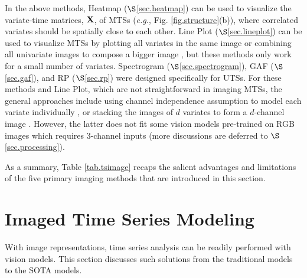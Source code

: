 In the above methods, Heatmap ($\S$\ref{sec.heatmap}) can be %
used to visualize the %
variate-time matrices, ${\bf X}$, of MTSs ({\em e.g.}, Fig. \ref{fig.structure}(b)), where correlated variates %
should be spatially close to each other. Line Plot ($\S$\ref{sec.lineplot}) can be used to visualize MTSs by plotting all variates in the same image \cite{wimmer2023leveraging,daswani2024plots} or combining all univariate images to compose a bigger %
image \cite {li2023time}, but these methods only work for a small number of variates. Spectrogram ($\S$\ref{sec.spectrogram}), GAF ($\S$\ref{sec.gaf}), and RP ($\S$\ref{sec.rp}) were designed specifically for UTSs. For these methods and Line Plot, which are not straightforward %
in imaging MTSs, the general approaches %
include using channel independence assumption to model each variate individually \cite{nie2023time}, %
or stacking the images of $d$ variates to form a $d$-channel image %
\cite{naiman2024utilizing,kim2024cafo}. %
However, the latter does not fit some vision models pre-trained on RGB images which requires 3-channel inputs (more discussions are deferred to $\S$\ref{sec.processing}).

\vspace{0.2cm}

 As a summary, Table \ref{tab.tsimage} recaps the salient advantages and limitations of the five primary imaging methods that are introduced in this section.


\section{Imaged Time Series Modeling}\label{sec.model}

With image representations, time series analysis can be readily performed with vision models. This section discusses such solutions from %
the traditional models to the SOTA models.

